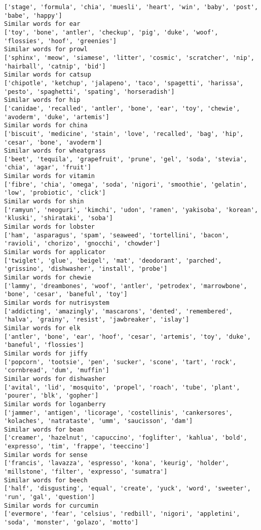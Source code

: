 \documentclass[11pt]{article}
\begin{document}
\begin{Verbatim}[commandchars=\\\{\}]
['stage', 'formula', 'chia', 'muesli', 'heart', 'win', 'baby', 'post', 'babe', 'happy']
Similar words for ear
['toy', 'bone', 'antler', 'checkup', 'pig', 'duke', 'woof', 'flossies', 'hoof', 'greenies']
Similar words for prowl
['sphinx', 'meow', 'siamese', 'litter', 'cosmic', 'scratcher', 'nip', 'hairball', 'catnip', 'bid']
Similar words for catsup
['chipotle', 'ketchup', 'jalapeno', 'taco', 'spagetti', 'harissa', 'pesto', 'spaghetti', 'spating', 'horseradish']
Similar words for hip
['canidae', 'recalled', 'antler', 'bone', 'ear', 'toy', 'chewie', 'avoderm', 'duke', 'artemis']
Similar words for china
['biscuit', 'medicine', 'stain', 'love', 'recalled', 'bag', 'hip', 'cesar', 'bone', 'avoderm']
Similar words for wheatgrass
['beet', 'tequila', 'grapefruit', 'prune', 'gel', 'soda', 'stevia', 'chia', 'agar', 'fruit']
Similar words for vitamin
['fibre', 'chia', 'omega', 'soda', 'nigori', 'smoothie', 'gelatin', 'low', 'probiotic', 'click']
Similar words for shin
['ramyun', 'neoguri', 'kimchi', 'udon', 'ramen', 'yakisoba', 'korean', 'kluski', 'shirataki', 'soba']
Similar words for lobster
['ham', 'asparagus', 'spam', 'seaweed', 'tortellini', 'bacon', 'ravioli', 'chorizo', 'gnocchi', 'chowder']
Similar words for applicator
['twiglet', 'glue', 'beigel', 'mat', 'deodorant', 'parched', 'grissino', 'dishwasher', 'install', 'probe']
Similar words for chewie
['lammy', 'dreambones', 'woof', 'antler', 'petrodex', 'marrowbone', 'bone', 'cesar', 'baneful', 'toy']
Similar words for nutrisystem
['addicting', 'amazingly', 'mascarons', 'dented', 'remembered', 'halva', 'grainy', 'resist', 'jawbreaker', 'islay']
Similar words for elk
['antler', 'bone', 'ear', 'hoof', 'cesar', 'artemis', 'toy', 'duke', 'baneful', 'flossies']
Similar words for jiffy
['popcorn', 'tootsie', 'pen', 'sucker', 'scone', 'tart', 'rock', 'cornbread', 'dum', 'muffin']
Similar words for dishwasher
['avital', 'lid', 'mosquito', 'propel', 'roach', 'tube', 'plant', 'pourer', 'blk', 'gopher']
Similar words for loganberry
['jammer', 'antigen', 'licorage', 'costellinis', 'cankersores', 'kolaches', 'natrataste', 'umm', 'saucisson', 'dam']
Similar words for bean
['creamer', 'hazelnut', 'capuccino', 'foglifter', 'kahlua', 'bold', 'expresso', 'tim', 'frappe', 'teeccino']
Similar words for sense
['francis', 'lavazza', 'espresso', 'kona', 'keurig', 'holder', 'millstone', 'filter', 'expresso', 'sumatra']
Similar words for beech
['half', 'disgusting', 'equal', 'create', 'yuck', 'word', 'sweeter', 'run', 'gal', 'question']
Similar words for curcumin
['evermore', 'fear', 'celsius', 'redbill', 'nigori', 'appletini', 'soda', 'monster', 'golazo', 'motto']

\end{Verbatim}
\end{document}
